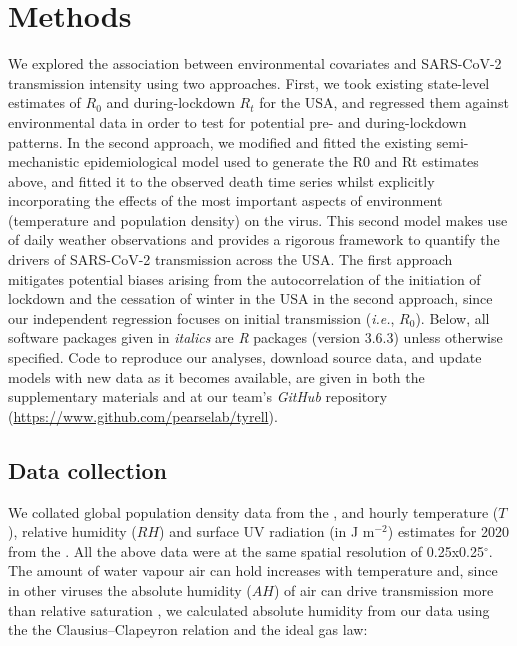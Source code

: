 \documentclass[12pt,english,a4paper]{article}
\newcommand{\virus}{SARS-CoV-2\xspace}
\newcommand{\RO}{$R_0$\xspace}
\begin{document}
\clearpage
\section*{Methods}

We explored the association between environmental covariates and \virus transmission intensity using two approaches. First, we took existing state-level estimates of \RO and during-lockdown $R_t$ for the USA\citep{Unwin2020a}, and regressed them against environmental data in order to test for potential pre- and during-lockdown patterns.
In the second approach, we modified and fitted the existing semi-mechanistic epidemiological model used to generate the R0 and Rt estimates above, and fitted it to the observed death time series whilst explicitly incorporating the effects of the most important aspects of environment (temperature and population density) on the virus. This second model makes use of daily weather observations and provides a rigorous framework to quantify the drivers of \virus transmission across the USA. The first approach mitigates potential biases arising from the autocorrelation of the initiation of lockdown and the cessation of winter in the USA in the second approach, since our independent regression focuses on initial transmission (\emph{i.e.}, \RO).
Below, all software packages given in \emph{italics} are \emph{R} packages (version 3.6.3)\cite{R2020} unless otherwise specified. Code to reproduce our analyses, download source data, and update models with new data as it becomes available, are given in both the supplementary materials and at our team's \emph{GitHub} repository (\url{https://www.github.com/pearselab/tyrell}).

\subsection*{Data collection}

 We collated global population density data from the \citet{GPWv4}, and hourly temperature ($T$),  relative humidity ($RH$) and surface UV radiation (in J m$^{-2}$) estimates for 2020 from the \citet{ECVs}. All the above data were at the same spatial resolution of 0.25x0.25$^{\circ}$. The amount of water vapour air can hold increases with temperature and, since in other viruses the absolute humidity ($AH$) of air can drive transmission more than relative saturation \citep{Shaman2009, Shaman2010}, we calculated absolute humidity from our data using the the Clausius–Clapeyron relation and the ideal gas law\cite{Shaman2009, Ma2020}:
\end{document}
